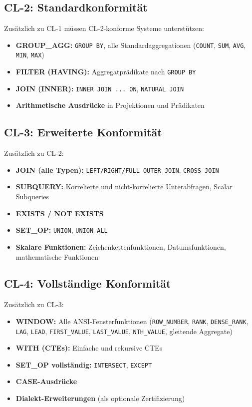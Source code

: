 \subsection{CL-2: Standardkonformität}
\label{subsec:cl2}

Zusätzlich zu CL-1 müssen CL-2-konforme Systeme unterstützen:

\begin{itemize}[leftmargin=1.5cm]
  \item \textbf{GROUP\_AGG:} \texttt{GROUP BY}, alle Standardaggregationen (\texttt{COUNT}, \texttt{SUM}, \texttt{AVG}, \texttt{MIN}, \texttt{MAX})
  \item \textbf{FILTER (HAVING):} Aggregatprädikate nach \texttt{GROUP BY}
  \item \textbf{JOIN (INNER):} \texttt{INNER JOIN ... ON}, \texttt{NATURAL JOIN}
  \item \textbf{Arithmetische Ausdrücke} in Projektionen und Prädikaten
\end{itemize}

\subsection{CL-3: Erweiterte Konformität}
\label{subsec:cl3}

Zusätzlich zu CL-2:

\begin{itemize}[leftmargin=1.5cm]
  \item \textbf{JOIN (alle Typen):} \texttt{LEFT/RIGHT/FULL OUTER JOIN}, \texttt{CROSS JOIN}
  \item \textbf{SUBQUERY:} Korrelierte und nicht-korrelierte Unterabfragen, Scalar Subqueries
  \item \textbf{EXISTS / NOT EXISTS}
  \item \textbf{SET\_OP:} \texttt{UNION}, \texttt{UNION ALL}
  \item \textbf{Skalare Funktionen:} Zeichenkettenfunktionen, Datumsfunktionen, mathematische Funktionen
\end{itemize}

\subsection{CL-4: Vollständige Konformität}
\label{subsec:cl4}

Zusätzlich zu CL-3:

\begin{itemize}[leftmargin=1.5cm]
  \item \textbf{WINDOW:} Alle ANSI-Fensterfunktionen (\texttt{ROW\_NUMBER}, \texttt{RANK}, \texttt{DENSE\_RANK}, \texttt{LAG}, \texttt{LEAD}, \texttt{FIRST\_VALUE}, \texttt{LAST\_VALUE}, \texttt{NTH\_VALUE}, gleitende Aggregate)
  \item \textbf{WITH (CTEs):} Einfache und rekursive CTEs
  \item \textbf{SET\_OP vollständig:} \texttt{INTERSECT}, \texttt{EXCEPT}
  \item \textbf{CASE-Ausdrücke}
  \item \textbf{Dialekt-Erweiterungen} (als optionale Zertifizierung)
\end{itemize}

